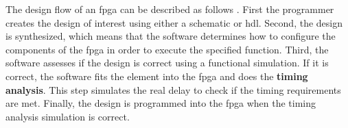 The design flow of an \acrshort{fpga} can be described as follows \cite{barte_value-added_2011}. First the programmer creates the design of interest using either a schematic or \acrshort{hdl}. Second, the design is synthesized, which means that the software determines how to configure the components of the \acrshort{fpga} in order to execute the specified function. Third, the software assesses if the design is correct using a functional simulation. If it is correct, the software fits the element into the \acrshort{fpga} and does the \textbf{timing analysis}. This step simulates the real delay to check if the timing requirements are met. Finally, the design is programmed into the \acrshort{fpga} when the timing analysis simulation is correct.